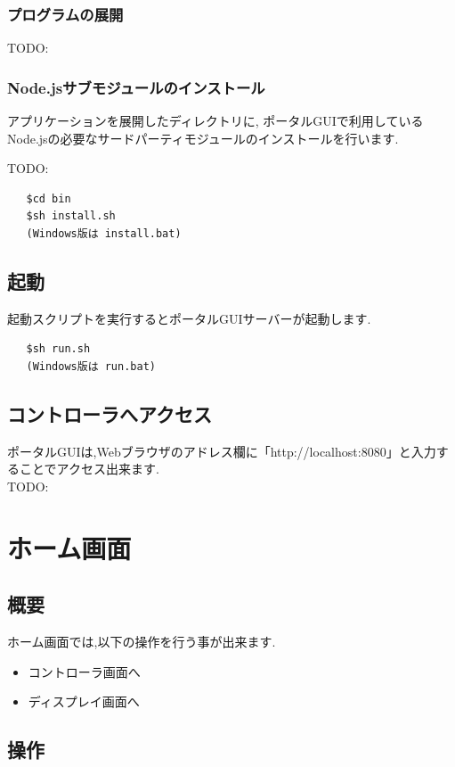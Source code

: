 \documentclass[a4paper,10pt,oneside]{jsbook}
\begin{document}
\subsection{プログラムの展開}

TODO:

\subsection{Node.jsサブモジュールのインストール}
アプリケーションを展開したディレクトリに,
ポータルGUIで利用しているNode.jsの必要なサードパーティモジュールのインストールを行います.

TODO:

\begin{verbatim}
   $cd bin
   $sh install.sh 
   (Windows版は install.bat)
\end{verbatim}

\newpage

\section{起動}
起動スクリプトを実行するとポータルGUIサーバーが起動します.
\begin{verbatim}
   $sh run.sh
   (Windows版は run.bat)
\end{verbatim}

\section{コントローラへアクセス}
ポータルGUIは,Webブラウザのアドレス欄に「http://localhost:8080」と入力することでアクセス出来ます.\\

TODO:

\chapter{ホーム画面}
\section{概要}
ホーム画面では,以下の操作を行う事が出来ます.

\begin{itemize}
\item コントローラ画面へ
\item ディスプレイ画面へ
\end{itemize}

\section{操作}
\end{document}
